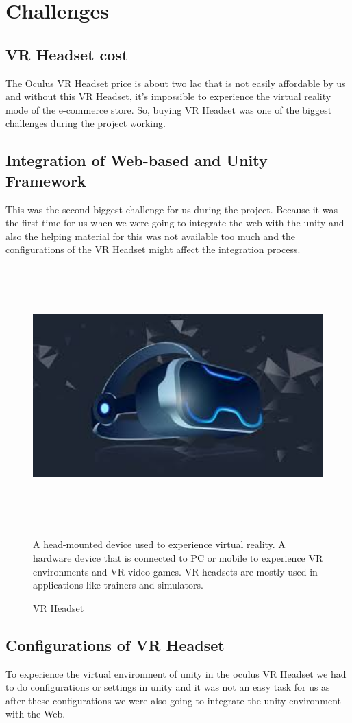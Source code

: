 \section{Challenges}
\subsection{VR Headset cost}
\justifying
The Oculus VR Headset price is about two lac that is not easily affordable by us and without this VR Headset, it's impossible to experience the virtual reality mode of the e-commerce store. So, buying VR Headset was one of the biggest challenges during the project working.
\subsection{Integration of Web-based and Unity Framework}
This was the second biggest challenge for us during the project. Because it was the first time for us when we were going to integrate the web with the unity and also the helping material for this was not available too much and the configurations of the VR Headset might affect the integration process.
\begin{figure}[H]
    \centering
    \includegraphics[width=15cm,height=10cm]{Figures/Others/VRHeadset.jpg}
    \caption{VR Headset}
    \label{VR HEeadset}
A head-mounted device used to experience virtual reality.  A hardware device that is connected to PC or mobile to experience VR environments and VR video games. VR headsets are mostly used in applications like trainers and simulators.
\end{figure}
\subsection{Configurations of VR Headset}
\justifying
To experience the virtual environment of unity in the oculus VR Headset we had to do configurations or settings in unity and it was not an easy task for us as after these configurations we were also going to integrate the unity environment with the Web.

